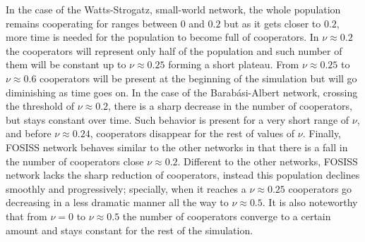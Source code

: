 \documentclass[11pt]{article}
\begin{document}
In the case of the Watts-Strogatz, small-world network, the whole population
remains cooperating for ranges between $0$ and $0.2$ but as it gets closer to
$0.2$, more time is needed for the population to become full of cooperators. In
$\nu \approx 0.2$ the cooperators will represent only half of the population and
such number of them will be constant up to $\nu \approx 0.25$ forming a short
plateau. From $\nu \approx 0.25$ to $\nu \approx 0.6$ cooperators will be
present at the beginning of the simulation but will go diminishing as time goes on.
In the case of the Barab\'asi-Albert network, crossing the threshold of $\nu
\approx 0.2$, there is a sharp decrease in the number of cooperators, but stays
constant over time. Such behavior is present for a very short range of $\nu$, and
before $\nu \approx 0.24$, cooperators disappear for the rest of values of
$\nu$. Finally, FOSISS network behaves similar to the other networks in that
there is a fall in the number of cooperators close  $\nu \approx 0.2$. Different
to the other networks, FOSISS network lacks the sharp reduction of
cooperators, instead this population declines smoothly and progressively;
specially, when it reaches a $\nu \approx 0.25$ cooperators go 
decreasing in a less dramatic manner all the way to $\nu \approx 0.5$. It is
also noteworthy that from $\nu = 0$ to $\nu \approx 0.5$ the number of
cooperators converge to a certain amount and stays constant for the rest of the
simulation. 
\end{document}
